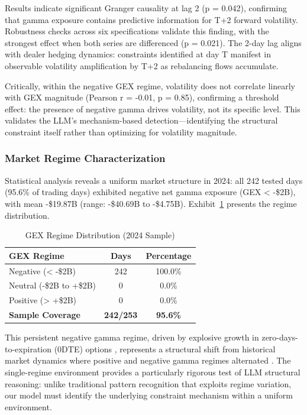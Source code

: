 Results indicate significant Granger causality at lag 2 (p = 0.042), confirming that gamma exposure contains predictive information for T+2 forward volatility. Robustness checks across six specifications validate this finding, with the strongest effect when both series are differenced (p = 0.021). The 2-day lag aligns with dealer hedging dynamics: constraints identified at day T manifest in observable volatility amplification by T+2 as rebalancing flows accumulate.

Critically, within the negative GEX regime, volatility does not correlate linearly with GEX magnitude (Pearson r = -0.01, p = 0.85), confirming a threshold effect: the presence of negative gamma drives volatility, not its specific level. This validates the LLM's mechanism-based detection—identifying the structural constraint itself rather than optimizing for volatility magnitude.

\subsubsection{Market Regime Characterization}

Statistical analysis reveals a uniform market structure in 2024: all 242 tested days (95.6\% of trading days) exhibited negative net gamma exposure (GEX < -\$2B), with mean -\$19.87B (range: -\$40.69B to -\$4.75B). Exhibit~\ref{ex:gex_regime-jv} presents the regime distribution.

\begin{table}[htbp]
\centering
\caption{GEX Regime Distribution (2024 Sample)}
\label{ex:gex_regime-jv}
\begin{tabular}{lcc}
\toprule
GEX Regime & Days & Percentage \\
\midrule
Negative (< -\$2B) & 242 & 100.0\% \\
Neutral (-\$2B to +\$2B) & 0 & 0.0\% \\
Positive (> +\$2B) & 0 & 0.0\% \\
\midrule
\textbf{Sample Coverage} & \textbf{242/253} & \textbf{95.6\%} \\
\bottomrule
\end{tabular}
\end{table}

This persistent negative gamma regime, driven by explosive growth in zero-days-to-expiration (0DTE) options \citep{cboe2023,jpmorgan2023}, represents a structural shift from historical market dynamics where positive and negative gamma regimes alternated \citep{ni2005stock,garleanu2009demand}. The single-regime environment provides a particularly rigorous test of LLM structural reasoning: unlike traditional pattern recognition that exploits regime variation, our model must identify the underlying constraint mechanism within a uniform environment.

